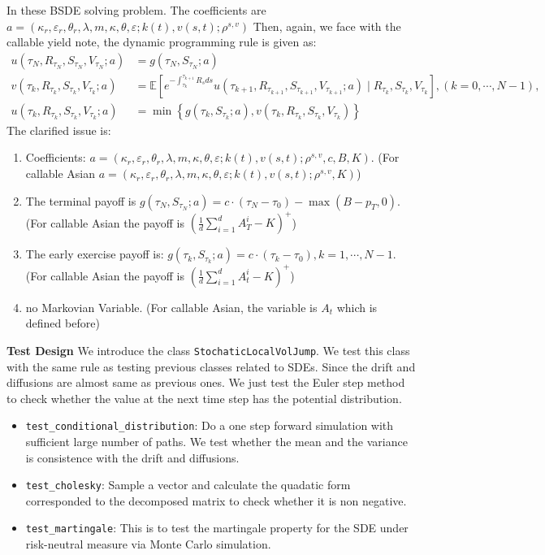 \documentclass[11pt,a4paper]{article}
\theoremstyle{remark}
\begin{document}
In these BSDE solving problem. The coefficients are $a = (\kappa_r, \varepsilon_r, \theta_r, \lambda, m, \kappa, \theta, \varepsilon; k(t), v(s, t); \rho^{s,v})$
Then, again, we face with the callable yield note, the dynamic programming rule is given as:
\begin{align}
	u(\tau_N, R_{\tau_N}, S_{\tau_N}, V_{\tau_N}; a) &= g(\tau_N, S_{\tau_N}; a)\\
	v(\tau_k, R_{\tau_k}, S_{\tau_k}, V_{\tau_k}; a) &= \mathbb{E}\left[e^{-\int_{\tau_k}^{\tau_{k+1}} R_s ds} u\left(\tau_{k+1}, R_{\tau_{k+1}}, S_{\tau_{k+1}}, V_{\tau_{k+1}}; a\right) \mid R_{\tau_k}, S_{\tau_k}, V_{\tau_k} \right] , (k = 0,\cdots, N-1),\\
	u(\tau_k, R_{\tau_k}, S_{\tau_k}, V_{\tau_k}; a) &= \min \left\{g(\tau_k,  S_{\tau_k}; a),  v(\tau_k, R_{\tau_k}, S_{\tau_k}, V_{\tau_k})\right\}
\end{align}
The clarified issue is:
\begin{enumerate}
	\item Coefficients: $a = (\kappa_r, \varepsilon_r, \theta_r, \lambda, m, \kappa, \theta, \varepsilon; k(t), v(s, t); \rho^{s,v}, c, B,  K)$. (For callable Asian $a = (\kappa_r, \varepsilon_r, \theta_r, \lambda, m, \kappa, \theta, \varepsilon; k(t), v(s, t); \rho^{s,v},  K)$)
	\item The terminal payoff is 	$g(\tau_N, S_{\tau_N}; a) = c \cdot (\tau_N - \tau_0) - \max(B - p_T, 0)$. (For callable Asian the payoff is $\left(\frac{1}{d}\sum_{i=1}^dA^i_T - K \right)^{+}$)
	\item The early exercise payoff is: $g(\tau_k, S_{\tau_k}; a) = c \cdot (\tau_k - \tau_0), k=1,\cdots,N-1 $. (For callable Asian the payoff is $\left(\frac{1}{d}\sum_{i=1}^dA^i_t - K \right)^{+}$)
	\item no Markovian Variable. (For callable Asian, the variable is $A_t$ which is defined before)
\end{enumerate}
\noindent \textbf{Test Design}
We introduce the class \texttt{StochaticLocalVolJump}. We test this class with the same rule as testing previous classes related to SDEs. Since the drift and diffusions are almost same as previous ones. We just test the Euler step method to check whether the value at the next time step has the potential distribution.
\begin{itemize}
	\item \texttt{test\_conditional\_distribution}: Do a one step forward simulation with sufficient large number of paths. We test whether the mean and the variance is consistence with the drift and diffusions.
	\item \texttt{test\_cholesky}: Sample a vector and calculate the quadatic form corresponded to the decomposed matrix to check whether it is non negative. 
	\item  \texttt{test\_martingale}: This is to test the martingale property for the SDE under risk-neutral measure via Monte Carlo simulation.
\end{itemize}
\end{document}
